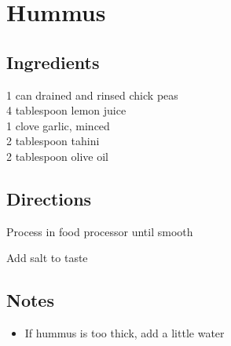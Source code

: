 \documentclass{article}
\newcounter{qcounter}
\begin{document}
\newcommand{\slfrac}[2]{\left.#1\middle/#2\right.}
\newcommand{\degree}{\ensuremath{^\circ}}

\section*{Hummus}



\subsection*{Ingredients}
1 can drained and rinsed chick peas\\
4 tablespoon lemon juice\\
1 clove garlic, minced\\
2 tablespoon tahini\\
2 tablespoon olive oil\\

\subsection*{Directions}
\begin{list}{:~}{}

\item Process in food processor until smooth
\item Add salt to taste
\end{list}

\subsection*{Notes}
\begin{itemize}
\item If hummus is too thick, add a little water
\end{itemize}
\end{document}

